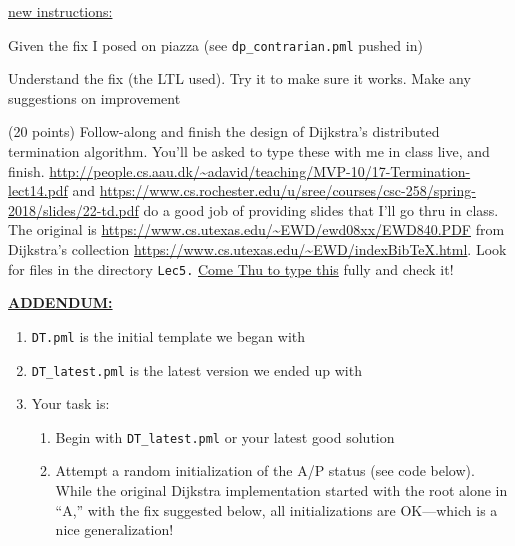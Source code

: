 \documentclass[11pt]{article}
\begin{document}
\begin{enumerate}
\begin{compactitem}
\begin{scriptsize}
  \end{scriptsize}

\item \underline{new instructions:}
  \begin{compactitem}
  \item Given the fix I posed on piazza (see {\tt dp\_contrarian.pml} pushed in)
  \item Understand the fix (the LTL used). Try it to make sure it works. Make any suggestions on improvement
  \end{compactitem}
  \end{compactitem}
  
\begin{minipage}{\minpagw}
\end{minipage}

\clearpage

\item (20 points) Follow-along and finish the design of
  Dijkstra's distributed termination algorithm.
  You'll be asked to type these with me in class live, and
  finish.
  \url{http://people.cs.aau.dk/~adavid/teaching/MVP-10/17-Termination-lect14.pdf}
  and
  \url{https://www.cs.rochester.edu/u/sree/courses/csc-258/spring-2018/slides/22-td.pdf}
  do a good job of providing slides
  that I'll go thru in class.
  The original is
  \url{https://www.cs.utexas.edu/~EWD/ewd08xx/EWD840.PDF}
  from Dijkstra's collection
  \url{https://www.cs.utexas.edu/~EWD/indexBibTeX.html}.
  Look for files in the directory {\tt Lec5.}
  \underline{Come Thu to type this} fully and check it!

  \underline{\bf ADDENDUM:\/}
  \begin{enumerate}
  \item {\tt DT.pml} is the initial template we began with
  \item  {\tt DT\_latest.pml} is the latest version we ended up with
  \item Your task is:
    \begin{enumerate}
    \item Begin with {\tt DT\_latest.pml} or your latest good solution
    \item Attempt a random initialization of the A/P status (see code below).
      While the original Dijkstra implementation started with the root alone
      in ``A,'' with the fix suggested below, all initializations are OK---which
      is a nice generalization!


\end{enumerate}
\end{enumerate}
\end{enumerate}
\end{document}
